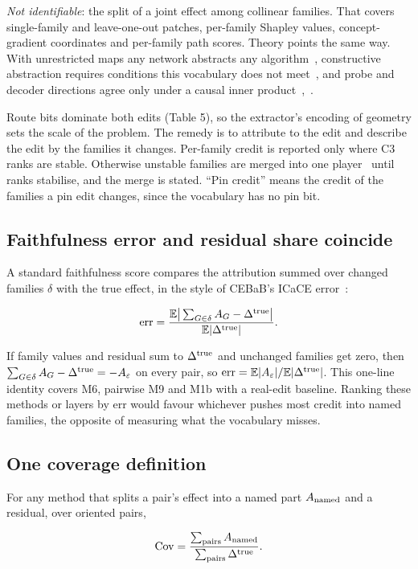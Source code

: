 \documentclass[conference]{IEEEtran}
\begin{document}
\emph{Not identifiable}: the split of a joint effect among collinear families. That covers single-family and leave-one-out patches, per-family Shapley values, concept-gradient coordinates and per-family path scores. Theory points the same way. With unrestricted maps any network abstracts any algorithm~\cite{sutter2025}, constructive abstraction requires conditions this vocabulary does not meet~\cite{beckers2019}, and probe and decoder directions agree only under a causal inner product~\cite{park2024},~\cite{nicolson2025}.

Route bits dominate both edits (Table 5), so the extractor's encoding of geometry sets the scale of the problem. The remedy is to attribute to the edit and describe the edit by the families it changes. Per-family credit is reported only where C3 ranks are stable. Otherwise unstable families are merged into one player~\cite{aas2021} until ranks stabilise, and the merge is stated. ``Pin credit'' means the credit of the families a pin edit changes, since the vocabulary has no pin bit.

\subsection{Faithfulness error and residual share coincide}\label{sec:9.2}
A standard faithfulness score compares the attribution summed over changed families $\delta$ with the true effect, in the style of CEBaB's ICaCE error~\cite{abraham2022}:

\[
\mathrm{err}=\frac{\mathbb E\big|\sum_{G\in\delta}A_G-\Delta^{\rm true}\big|}{\mathbb E|\Delta^{\rm true}|}.
\]

If family values and residual sum to $\Delta^{\rm true}$ and unchanged families get zero, then $\sum_{G\in\delta}A_G-\Delta^{\rm true}=-A_\varepsilon$ on every pair, so $\mathrm{err}=\mathbb E|A_\varepsilon|/\mathbb E|\Delta^{\rm true}|$. This one-line identity covers M6, pairwise M9 and M1b with a real-edit baseline. Ranking these methods or layers by err would favour whichever pushes most credit into named families, the opposite of measuring what the vocabulary misses.

\subsection{One coverage definition}\label{sec:9.3}
For any method that splits a pair's effect into a named part $A_{\rm named}$ and a residual, over oriented pairs,

\[
\mathrm{Cov}=\frac{\sum_{\rm pairs}A_{\rm named}}{\sum_{\rm pairs}\Delta^{\rm true}}.
\]
\end{document}
